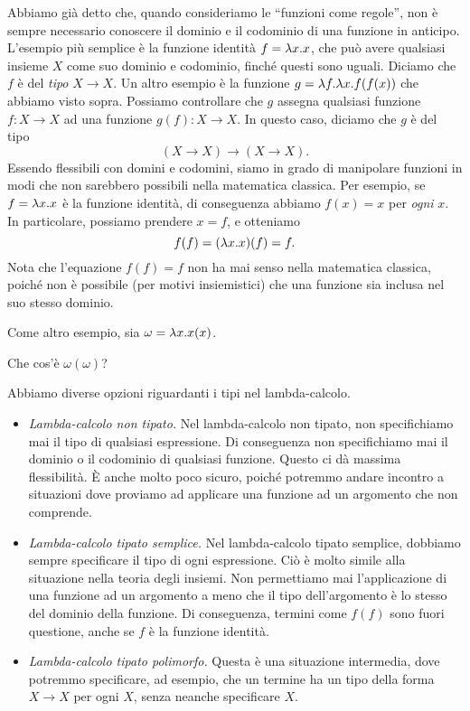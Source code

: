 \documentclass{article}
\begin{document}
Abbiamo gi\`a detto che, quando consideriamo le ``funzioni come regole'', 
non \`e sempre necessario conoscere il dominio e il codominio
di una funzione in anticipo. L'esempio pi\`u semplice \`e la funzione identit\`a
$f = \lambda x.x$, che pu\`o avere qualsiasi insieme $X$ come suo dominio e codominio,
finch\'e questi sono uguali. Diciamo che
$f$ \`e del {\em tipo} $X\to X$. Un altro esempio \`e la funzione $g = \lambda f.\lambda
x.f(f(x))$ che abbiamo visto sopra. Possiamo controllare che $g$ assegna 
qualsiasi funzione $f:X\to X$ ad una funzione $g(f):X\to X$. In questo caso, diciamo
che $g$ \`e del tipo
\[          (X\to X)\to(X\to X).
\]
Essendo flessibili con domini e codomini, siamo in grado
di manipolare funzioni in modi che non sarebbero possibili
nella matematica classica. Per esempio, se $f=\lambda x.x$ \`e la funzione identit\`a,
di conseguenza abbiamo $f(x) = x$ per {\em ogni} $x$. In particolare, possiamo prendere
$x=f$, e otteniamo
\[     f(f) = (\lambda x.x)(f) = f.
\]
Nota che l'equazione $f(f)=f$ non ha mai senso nella matematica
classica, poich\'e non \`e possibile (per motivi insiemistici) che una
funzione sia inclusa nel suo stesso dominio.

Come altro esempio, sia $\omega = \lambda x.x(x)$. 

\begin{exercise}
  Che cos'\`e $\omega(\omega)$?
\end{exercise}

Abbiamo diverse opzioni riguardanti i tipi nel lambda-calcolo.
\begin{itemize}
\item {\em Lambda-calcolo non tipato.} Nel lambda-calcolo non tipato,
non specifichiamo mai il tipo di qualsiasi espressione. Di conseguenza
non specifichiamo mai il dominio o il codominio di qualsiasi funzione. Questo ci 
d\`a massima flessibilit\`a. \`E anche molto poco sicuro, poich\'e potremmo andare incontro a
situazioni dove proviamo ad applicare una funzione ad un argomento che
non comprende.
\item {\em Lambda-calcolo tipato semplice.} Nel lambda-calcolo tipato semplice,
dobbiamo sempre specificare il tipo di ogni espressione.
Ci\`o \`e molto simile alla situazione nella teoria degli insiemi. Non permettiamo
mai l'applicazione di una funzione ad un argomento a meno che il tipo
dell'argomento \`e lo stesso del dominio della funzione. Di conseguenza,
termini come $f(f)$ sono fuori questione, anche se $f$ \`e la funzione identit\`a.
\item {\em Lambda-calcolo tipato polimorfo.} Questa \`e una
situazione intermedia, dove potremmo specificare, ad esempio, che
un termine ha un tipo della forma $X\to X$ per ogni $X$, senza neanche
specificare $X$.
\end{itemize}
\end{document}

